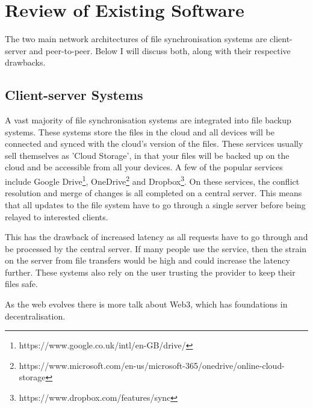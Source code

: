 \documentclass[12pt]{report}
\begin{document}
\section{Review of Existing Software}
The two main network architectures of file synchronisation systems are client-server and peer-to-peer. Below I will discuss both, along with their respective drawbacks.


\subsection{Client-server Systems}
A vast majority of file synchronisation systems are integrated into file backup systems. These systems store the files in the cloud and all devices will be connected and synced with the cloud's version of the files. These services usually sell themselves as 'Cloud Storage', in that your files will be backed up on the cloud and be accessible from all your devices. A few of the popular services include Google Drive\footnote{https://www.google.co.uk/intl/en-GB/drive/}, OneDrive\footnote{https://www.microsoft.com/en-us/microsoft-365/onedrive/online-cloud-storage} and Dropbox\footnote{https://www.dropbox.com/features/sync}. On these services, the conflict resolution and merge of changes is all completed on a central server. This means that all updates to the file system have to go through a single server before being relayed to interested clients. \par

This has the drawback of increased latency as all requests have to go through and be processed by the central server. If many people use the service, then the strain on the server from file transfers would be high and could increase the latency further. These systems also rely on the user trusting the provider to keep their files safe. \par

As the web evolves there is more talk about Web3\cite{WhatIsWeb3}, which has foundations in decentralisation.
\end{document}
